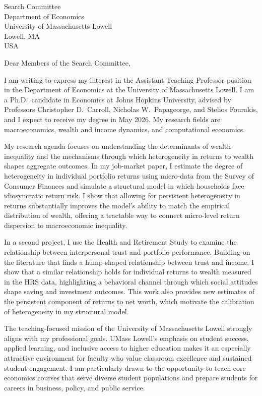 \documentclass[11pt,letterpaper]{letter}
\begin{document}
\begin{letter}{Search Committee \\
Department of Economics \\
University of Massachusetts Lowell \\
Lowell, MA \\ USA}

\opening{Dear Members of the Search Committee,}

I am writing to express my interest in the Assistant Teaching Professor position in the Department of Economics at the University of Massachusetts Lowell. I am a Ph.D.\ candidate in Economics at Johns Hopkins University, advised by Professors Christopher D.~Carroll, Nicholas W.~Papageorge, and Stelios Fourakis, and I expect to receive my degree in May 2026. My research fields are macroeconomics, wealth and income dynamics, and computational economics.

My research agenda focuses on understanding the determinants of wealth inequality and the mechanisms through which heterogeneity in returns to wealth shapes aggregate outcomes. In my job-market paper, I estimate the degree of heterogeneity in individual portfolio returns using micro-data from the Survey of Consumer Finances and simulate a structural model in which households face idiosyncratic return risk. I show that allowing for persistent heterogeneity in returns substantially improves the model’s ability to match the empirical distribution of wealth, offering a tractable way to connect micro-level return dispersion to macroeconomic inequality.

In a second project, I use the Health and Retirement Study to examine the relationship between interpersonal trust and portfolio performance. Building on the literature that finds a hump-shaped relationship between trust and income, I show that a similar relationship holds for individual returns to wealth measured in the HRS data, highlighting a behavioral channel through which social attitudes shape saving and investment outcomes. This work also provides new estimates of the persistent component of returns to net worth, which motivate the calibration of heterogeneity in my structural model.

The teaching-focused mission of the University of Massachusetts Lowell strongly aligns with my professional goals. UMass Lowell’s emphasis on student success, applied learning, and inclusive access to higher education makes it an especially attractive environment for faculty who value classroom excellence and sustained student engagement. I am particularly drawn to the opportunity to teach core economics courses that serve diverse student populations and prepare students for careers in business, policy, and public service.


\end{letter}
\end{document}
